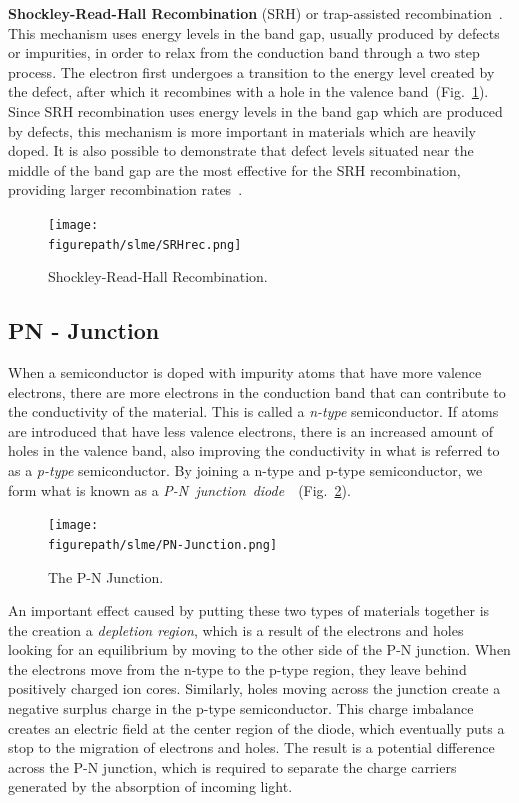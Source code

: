 \begin{refsection}
\textbf{Shockley-Read-Hall Recombination} (SRH) or trap-assisted 
recombination~\cite{Shockley1952}\cite{Hall1952}. This mechanism uses energy 
levels in the band gap, usually produced by defects or impurities, in order to 
relax from the conduction band through a two step process. The electron first 
undergoes a transition to the energy level created by the defect, after which 
it recombines with a hole in the valence band~(Fig.~\ref{slme:fig-SRHrec}). 
Since SRH recombination uses energy levels in the band gap which are produced 
by defects, this mechanism is more important in materials which are heavily 
doped. It is also possible to demonstrate that defect levels situated near the 
middle of the band gap are the most effective for the SRH recombination, 
providing larger recombination rates~\cite{Green1981}. 
\begin{figure}[ht]  
\centering 
\texttt{[image: \\figurepath/slme/SRHrec.png]} 
\caption{\label{slme:fig-SRHrec}Shockley-Read-Hall Recombination.} 
\end{figure} 

\subsection{PN - Junction} 
 
When a semiconductor is doped with impurity atoms that have more valence 
electrons, there are more electrons in the conduction band that can contribute 
to the conductivity of the material. This is called a \textit{n-type} 
semiconductor. If atoms are introduced that have less valence electrons, there 
is an increased amount of holes in the valence band, also improving the  
conductivity in what is referred to as a \textit{p-type} semiconductor. By 
joining a n-type and p-type semiconductor, we form what is known as a 
\textit{P-N~junction~diode}~\cite{Shockley1949}~(Fig.~\ref{slme:fig-PNjunction}). 
 
\begin{figure}[ht]
\centering 
\captionsetup{width=0.8\textwidth}
\texttt{[image: \\figurepath/slme/PN-Junction.png]} 
\caption{\label{slme:fig-PNjunction} The P-N Junction. \cite{PNjunction}} 
\end{figure} 
 
An important effect caused by putting these two types of materials together is 
the creation a \textit{depletion region}, which is a result of the electrons 
and holes looking for an equilibrium by moving to the other side of the P-N 
junction. When the electrons move from the n-type to the p-type region, they 
leave behind positively charged ion cores. Similarly, holes moving across the 
junction create a negative surplus charge in the p-type semiconductor. This 
charge imbalance creates an electric field at the center region of the diode, 
which eventually puts a stop to the migration of electrons and holes. The 
result is a potential difference across the P-N junction, which is required to 
separate the charge carriers generated by the absorption of incoming light. 
 

\end{refsection}
